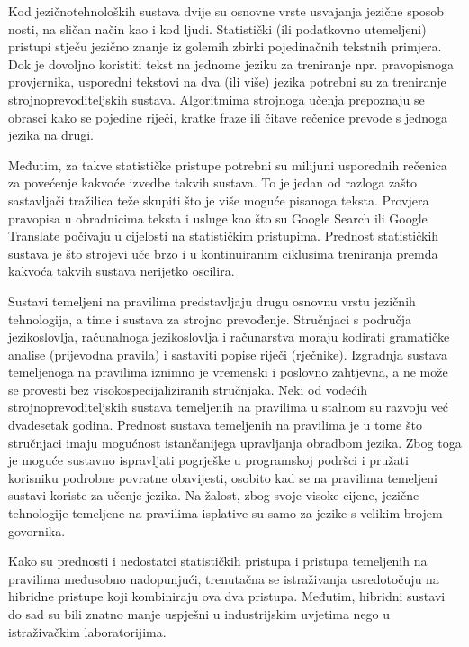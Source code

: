 \begin{multicols}{2}

Kod jezičnotehnoloških sustava dvije su osnovne vrste usvajanja jezične sposob
nosti, na sličan način kao i kod ljudi. Statistički (ili podatkovno utemeljeni) pristupi stječu jezično znanje iz golemih zbirki pojedinačnih tekstnih primjera. Dok je dovoljno koristiti tekst na jednome jeziku za treniranje npr. pravopisnoga provjernika, usporedni tekstovi na dva (ili više) jezika potrebni su za treniranje strojnoprevoditeljskih sustava. Algoritmima strojnoga učenja prepoznaju se obrasci kako se pojedine riječi, kratke fraze ili čitave rečenice prevode s jednoga jezika na drugi.

Međutim, za takve statističke pristupe potrebni su milijuni usporednih rečenica za povećenje kakvoće izvedbe takvih sustava. To je jedan od razloga zašto sastavljači tražilica teže skupiti što je više moguće pisanoga teksta. Provjera pravopisa u obradnicima teksta i usluge kao što su Google Search ili Google Translate počivaju u cijelosti na statističkim pristupima. Prednost statističkih sustava je što strojevi uče brzo i u kontinuiranim ciklusima treniranja premda kakvoća takvih sustava nerijetko oscilira.

Sustavi temeljeni na pravilima predstavljaju drugu osnovnu vrstu jezičnih tehnologija, a time i sustava za strojno prevođenje. Stručnjaci s područja jezikoslovlja, računalnoga jezikoslovlja i računarstva moraju kodirati gramatičke analise (prijevodna pravila) i sastaviti popise riječi (rječnike). Izgradnja sustava temeljenoga na pravilima iznimno je vremenski i poslovno zahtjevna, a ne može se provesti bez visokospecijaliziranih stručnjaka. Neki od vodećih strojnoprevoditeljskih sustava temeljenih na pravilima u stalnom su razvoju već dvadesetak godina. Prednost sustava temeljenih na pravilima je u tome što stručnjaci imaju mogućnost istančanijega upravljanja obradbom jezika. Zbog toga je moguće sustavno ispravljati pogrješke u programskoj podršci i pružati korisniku podrobne povratne obavijesti, osobito kad se na pravilima temeljeni sustavi koriste za učenje jezika. Na žalost, zbog svoje visoke cijene, jezične tehnologije temeljene na pravilima isplative su samo za jezike s velikim brojem govornika.

Kako su prednosti i nedostatci statističkih pristupa i pristupa temeljenih na pravilima međusobno nadopunjući, trenutačna se istraživanja usredotočuju na hibridne pristupe koji kombiniraju ova dva pristupa. Međutim, hibridni sustavi do sad su bili znatno manje uspješni u industrijskim uvjetima nego u istraživačkim laboratorijima.


\end{multicols}
